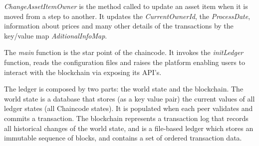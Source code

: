 \textit{ChangeAssetItemOwner} is the method called to update an asset item when it is moved from a step to another. It updates the \textit{CurrentOwnerId}, the \textit{ProcessDate}, information about prices and many other details of the transactions by the key/value map \textit{AditionalInfoMap}.

The \textit{main} function is the star point of the chaincode. It invokes the \textit{initLedger} function, reads the configuration files and raises the platform enabling users to interact with the blockchain via exposing its API's.

The ledger is composed by two parts: the world state and the blockchain. The world state is a database that stores (as a key value pair) the current values of all ledger states (all Chaincode states). It is populated when each peer validates and commits a transaction. The blockchain represents a transaction log that records all historical changes of the world state, and is a file-based ledger which stores an immutable sequence of blocks, and contains a set of ordered transaction data.